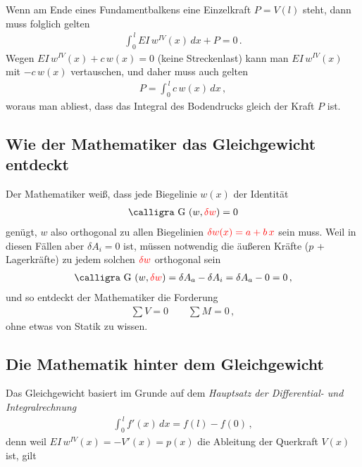 {{{{{Wenn am Ende eines Fundamentbalkens eine Einzelkraft $P = V(l)$ steht, dann muss folglich gelten
\begin{align}
\int_0^{\,l} EI\,w^{IV}(x)\, dx + P = 0\,.
\end{align}
Wegen $EI\,w^{IV}(x) + c\,w(x) = 0$ (keine Streckenlast) kann man $EI\,w^{IV}(x) $ mit $-c\,w(x) $ vertauschen, und daher muss auch gelten
\begin{align}
 P =  \int_0^{\,l} c\,w(x)\,dx\,,
\end{align}
woraus man abliest, dass das Integral des Bodendrucks gleich der Kraft $P$ ist.


{\textcolor{sectionTitleBlue}{\section{Wie der Mathematiker das Gleichgewicht entdeckt}}}
Der Mathematiker wei{\ss}, dass jede Biegelinie $w(x)$ der Identit\"{a}t
\begin{align}
\text{\normalfont\calligra G\,\,}(w,\textcolor{red}{\delta w}) = 0
\end{align}
gen\"{u}gt, $w$ also orthogonal zu allen Biegelinien $\textcolor{red}{\delta w(x) = a + b\, x}$ sein muss. Weil in diesen F\"{a}llen aber $\delta A_i = 0$ ist, m\"{u}ssen notwendig die \"{a}u{\ss}eren Kr\"{a}fte ($p$ + Lagerkr\"{a}fte) zu jedem solchen $\textcolor{red}{\delta w}$ orthogonal sein
\begin{align}
\text{\normalfont\calligra G\,\,}(w,\textcolor{red}{\delta w}) = \delta A_a - \delta A_i = \delta A_a - 0 = 0\,,
\end{align}
und so entdeckt der Mathematiker die Forderung
\begin{align}
\sum V = 0 \qquad \sum M = 0\,,
\end{align}
ohne etwas von Statik zu wissen.
\pagebreak
{\textcolor{sectionTitleBlue}{\section{Die Mathematik hinter dem Gleichgewicht}}}
Das Gleichgewicht basiert im Grunde auf dem {\em Hauptsatz der Differential- und Integralrechnung\/}
\begin{align}
\int_0^{\,l} f'(x)\,dx = f(l) - f(0)\,,
\end{align}
denn weil $EI\,w^{IV}(x) = - V'(x) = p(x)$ die Ableitung der Querkraft $V(x) $ ist, gilt
}}}}}

